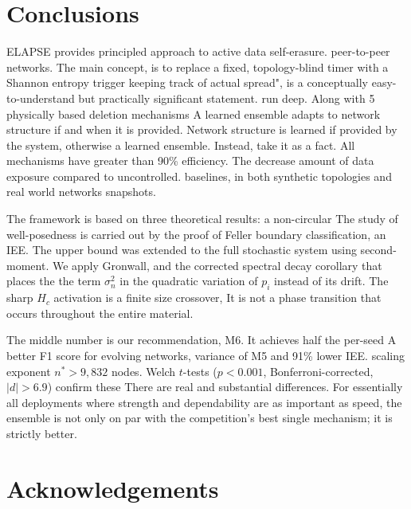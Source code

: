\documentclass[conference]{IEEEtran}
\newcommand{\Hc}{H_c}
\begin{document}
\section{Conclusions}

ELAPSE provides principled approach to active data self-erasure.
peer-to-peer networks.  The main concept, is to replace a fixed,
topology-blind timer with a Shannon entropy trigger keeping track of
actual spread", is a conceptually easy-to-understand but practically significant statement.
run deep.  Along with 5 physically based deletion mechanisms
A learned ensemble adapts to network structure if and when it is provided. 
Network structure is learned if provided by the system, otherwise a learned ensemble.
Instead, take it as a fact.  All mechanisms have greater than 90\% efficiency.
The decrease amount of data exposure compared to uncontrolled.
baselines, in both synthetic topologies and real world networks
snapshots.

The framework is based on three theoretical results: a non-circular
The study of well-posedness is carried out by the proof of Feller boundary classification, an IEE.
The upper bound was extended to the full stochastic system using second-moment.
We apply Gronwall, and the corrected spectral decay corollary that places the
the term $\sigma_n^2$ in the quadratic variation of $p_i$ instead of
its drift.  The sharp $\Hc$ activation is a finite size crossover,
It is not a phase transition that occurs throughout the entire material.

The middle number is our recommendation, M6.  It achieves half the per-seed
A better F1 score for evolving networks, variance of M5 and 91\% lower IEE.
scaling exponent $n^*>9{,}832$ nodes.  Welch $t$-tests
($p<0.001$, Bonferroni-corrected, $|d|>6.9$) confirm these
There are real and substantial differences.  For essentially all deployments
where strength and dependability are as important as speed,
the ensemble is not only on par with the competition's best single
mechanism; it is strictly better.

\section*{Acknowledgements}
\end{document}
